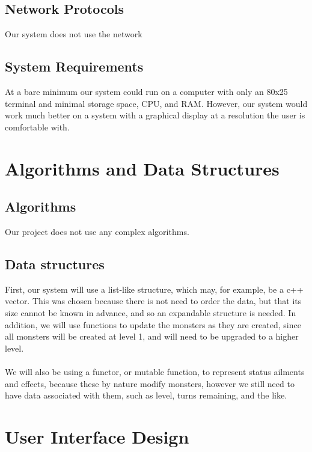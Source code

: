 \documentclass[letterpaper,12pt]{article}
\begin{document}
\subsection{Network Protocols}
Our system does not use the network
\subsection{System Requirements}
At a bare minimum our system could run on a computer with only an
80x25 terminal and minimal storage space, CPU, and RAM. However, our
system would work much better on a system with a graphical display at
a resolution the user is comfortable with.
\section{Algorithms and Data Structures}
\subsection{Algorithms}
Our project does not use any complex algorithms.
\subsection{Data structures}
First, our system will use a list-like structure, which may, for
example, be a c++ vector. This was chosen because there is not need to
order the data, but that its size cannot be known in advance, and so
an expandable structure is needed. In addition, we will use functions
to update the monsters as they are created, since all monsters will
be created at level 1, and will need to be upgraded to a higher level.\\
\hfill\\

We will also be using a functor, or mutable function, to represent
status ailments and effects, because these by nature modify monsters, however
we still need to have data associated with them, such as level, turns
remaining, and the like.
\section{User Interface Design}
\end{document}
